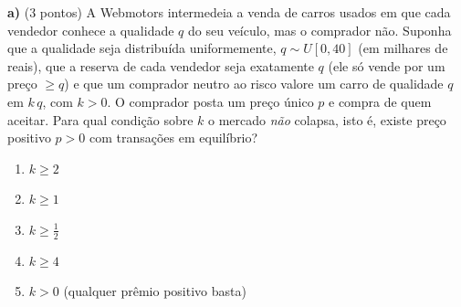 \textbf{a)} (3 pontos) A Webmotors intermedeia a venda de carros usados em que cada vendedor conhece a qualidade $q$ do seu ve\'iculo, mas o comprador n\~ao. Suponha que a qualidade seja distribu\'ida uniformemente, $q \sim U[0,40]$ (em milhares de reais), que a reserva de cada vendedor seja exatamente $q$ (ele s\'o vende por um pre\c{c}o $\ge q$) e que um comprador neutro ao risco valore um carro de qualidade $q$ em $k\,q$, com $k>0$. O comprador posta um pre\c{c}o \'unico $p$ e compra de quem aceitar. Para qual condi\c{c}\~ao sobre $k$ o mercado \emph{n\~ao} colapsa, isto \'e, existe pre\c{c}o positivo $p>0$ com transa\c{c}\~oes em equil\'ibrio?

\begin{enumerate}[label=\Alph*., leftmargin=3.2em, itemsep=0.15em, topsep=0.2em]
  \item $k \ge 2$
  \item $k \ge 1$
  \item $k \ge \tfrac{1}{2}$
  \item $k \ge 4$
  \item $k > 0$ (qualquer pr\^emio positivo basta)
\end{enumerate}
